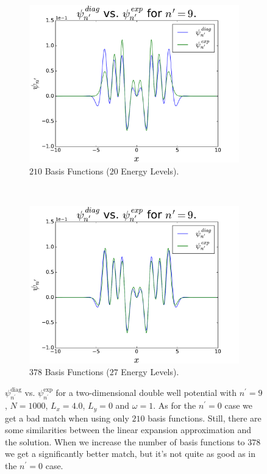 \documentclass[../main.tex]{subfiles}
\begin{document}
\begin{figure}
    \centering
    \begin{subfigure}{0.5\textwidth}
        \centering
        \includegraphics[scale=0.4]{figures/psiComp/psiComp_nPrime9_BF210}
        \caption{$210$ Basis Functions ($20$ Energy Levels).}
        \label{fig:nPrime9a}
    \end{subfigure}%
    ~ 
    \begin{subfigure}{0.5\textwidth}
        \centering
        \includegraphics[scale=0.4]{figures/psiComp/psiComp_nPrime9_BF378}
        \caption{$378$ Basis Functions ($27$ Energy Levels).}
        \label{fig:nPrime9b}
    \end{subfigure}
    \caption{$\psi_{n^\prime}^\textrm{diag}$ vs. $\psi_{n^\prime}^\textrm{exp}$ for a two-dimensional double well potential with $n^\prime = 9$, $N=1000$, $L_x = 4.0$, $L_y = 0$ and $\omega = 1$. As for the $n^\prime = 0$ case we get a bad match when using only $210$ basis functions. Still, there are some similarities between the linear expansion approximation and the solution. When we increase the number of basis functions to $378$ we get a significantly better match, but it's not quite as good as in the $n^\prime = 0$ case.}
    \label{fig:nPrime9}
\end{figure}
\end{document}
